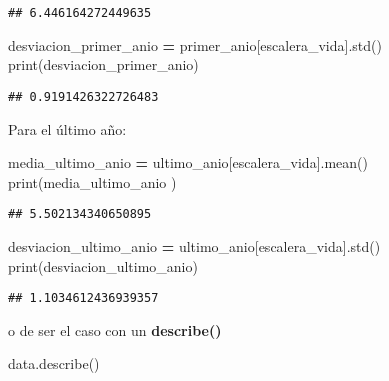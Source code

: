 \documentclass[
]{article}
\newenvironment{Shaded}{\begin{snugshade}}{\end{snugshade}}
\newcommand{\BuiltInTok}[1]{#1}
\newcommand{\NormalTok}[1]{#1}
\newcommand{\OperatorTok}[1]{\textcolor[rgb]{0.81,0.36,0.00}{\textbf{#1}}}
\newcommand{\StringTok}[1]{\textcolor[rgb]{0.31,0.60,0.02}{#1}}
\begin{document}
\begin{verbatim}
## 6.446164272449635
\end{verbatim}

\begin{Shaded}
\begin{Highlighting}[]
\NormalTok{desviacion\_primer\_anio }\OperatorTok{=}\NormalTok{ primer\_anio[}\StringTok{\textquotesingle{}escalera\_vida\textquotesingle{}}\NormalTok{].std()}
\BuiltInTok{print}\NormalTok{(desviacion\_primer\_anio)}
\end{Highlighting}
\end{Shaded}

\begin{verbatim}
## 0.9191426322726483
\end{verbatim}

Para el último año:

\begin{Shaded}
\begin{Highlighting}[]
\NormalTok{media\_ultimo\_anio }\OperatorTok{=}\NormalTok{ ultimo\_anio[}\StringTok{\textquotesingle{}escalera\_vida\textquotesingle{}}\NormalTok{].mean()}
\BuiltInTok{print}\NormalTok{(media\_ultimo\_anio )}
\end{Highlighting}
\end{Shaded}

\begin{verbatim}
## 5.502134340650895
\end{verbatim}

\begin{Shaded}
\begin{Highlighting}[]
\NormalTok{desviacion\_ultimo\_anio }\OperatorTok{=}\NormalTok{ ultimo\_anio[}\StringTok{\textquotesingle{}escalera\_vida\textquotesingle{}}\NormalTok{].std()}
\BuiltInTok{print}\NormalTok{(desviacion\_ultimo\_anio)}
\end{Highlighting}
\end{Shaded}

\begin{verbatim}
## 1.1034612436939357
\end{verbatim}

o de ser el caso con un \textbf{describe()}

\begin{Shaded}
\begin{Highlighting}[]
\NormalTok{data.describe()}
\end{Highlighting}
\end{Shaded}
\end{document}
